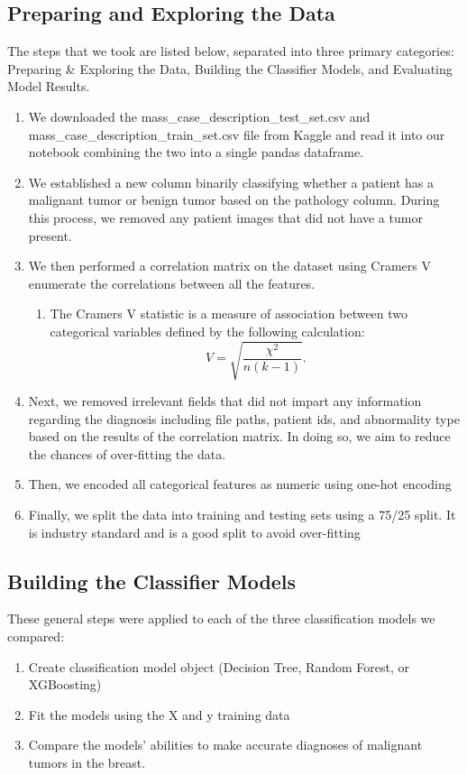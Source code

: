 \documentclass[twoside,twocolumn]{article}
\begin{document}
\subsection{Preparing and Exploring the Data}
The steps that we took are listed below, separated into three primary categories: Preparing \& Exploring the Data, Building the Classifier Models, and Evaluating Model Results. 
\begin{enumerate}
	\item We downloaded the mass\_case\_description\_test\_set.csv and mass\_case\_description\_train\_set.csv file from Kaggle and read it into our notebook combining the two into a single pandas dataframe.
 	\item We established a new column binarily classifying whether a patient has a malignant tumor or benign tumor based on the pathology column. During this process, we removed any patient images that did not have a tumor present.
	\item We then performed a correlation matrix on the dataset using Cramers V enumerate the correlations between all the features.
            \begin{enumerate}
                \item The Cramers V statistic is a measure of association between two categorical variables defined by the following calculation:
                \begin{equation}
                    V = \sqrt{\frac{\chi^2}{n(k-1)}}.
                \end{equation}
            \end{enumerate}
        \item Next, we removed irrelevant fields that did not impart any information regarding the diagnosis including file paths, patient ids, and abnormality type based on the results of the correlation matrix. In doing so, we aim to reduce the chances of over-fitting the data.
	\item Then, we encoded all categorical features as numeric using one-hot encoding
	\item Finally, we split the data into training and testing sets using a 75/25 split. It is industry standard and is a good split to avoid over-fitting
\end{enumerate}

\subsection{Building the Classifier Models}
These general steps were applied to each of the three classification models we compared:
\begin{enumerate}
	\item Create classification model object (Decision Tree, Random Forest, or XGBoosting)
	\item Fit the models using the X and y training data
        \item Compare the models' abilities to make accurate diagnoses of malignant tumors in the breast.
\end {enumerate}
\end{document}
